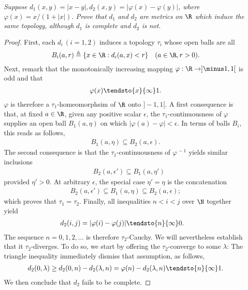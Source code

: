 \textit{Suppose %
%
  $d_1(x,y) = |x-y|, d_2(x,y) = |\varphi(x) - \varphi(y)|$, %
%
where %
%
  $\varphi(x)={x}/{(1+\lvert x \rvert )}$. %
%
Prove that $d_1$ and $d_2$ are metrics on $\R$ which induce the same %
topology, although $d_1$ is complete and $d_2$ is not.
}
%
\begin{proof}%
First, each $d_i\, (i=1, 2)$ induces a topology $\tau_i$ %
whose open balls are all %
%
\begin{align}\label{1_12_2}
  B_i(a,r) \triangleq \{x \in \R: d_i (a, x) < r \} 
  \quad (a \in \R, r > 0 ).
\end{align}
%
Next, remark that the monotonically increasing mapping %
$\varphi: \R \to ]\minus 1, 1[$ is odd and that %
%
\begin{align}\label{1_12_1}
  \varphi(x) \tendsto{x}{\infty} 1.
\end{align}
%
$\varphi$ is therefore a $\tau_1$-homeomorphsim of $\R$ onto $]\minus 1, 1[$. %
%
A first consequence is that, at fixed $a \in \R$, given any positive scalar %
$\epsilon$, the $\tau_1$-continuousness of $\varphi$ supplies an open ball %
$B_1(a,\eta)$ on which $|\varphi(a)-\varphi|<\epsilon$. %
In terms of balls $B_i$, this reads as follows, %
%
\begin{align}
  B_1(a,\eta) \subseteq B_2(a,\epsilon).
\end{align}
%
The second consequence is that the $\tau_1$-continuousness of %
$\varphi^{\, \minus 1}$ yields similar inclusions %
%
\begin{align} \label{1_12_6}
\quad B_2(a, \epsilon') \subseteq B_1 (a, \eta')
\end{align}
%
provided $\eta'>0$. At arbitrary $\epsilon$, the special case $\eta' = \eta$ %
is the concatenation %
%
\begin{align}
  B_2(a, \epsilon') \subseteq B_1(a,\eta) \subseteq B_2(a,\epsilon); 
\end{align}
%
which proves that $\tau_1 =\tau_2$. %
%
Finally, all inequalities $n < i < j$ over $\N$ together yield %
%
\begin{align}
  d_2(i, j)=|\varphi(i)-\varphi(j)| \tendsto{n}{\infty} 0.
\quad \end{align}
%
The sequence $n=0, 1, 2, \dots$ is therefore $\tau_2$-Cauchy. We will %
nevertheless establish that it $\tau_2$-diverges. To do so, we start by %
offering the $\tau_2$-converge to some $\lambda$: %
The triangle inequality immediately dismiss that assumption, as follows, %
%
\begin{align}
  d_2(0, \lambda) \geq 
  d_2(0, n) - d_2(\lambda, n) = 
  \varphi(n) -d_2(\lambda, n)  \tendsto{n}{\infty} 1.
\end{align}
%
We then conclude that $d_2$ fails to be complete. 
\end{proof}
